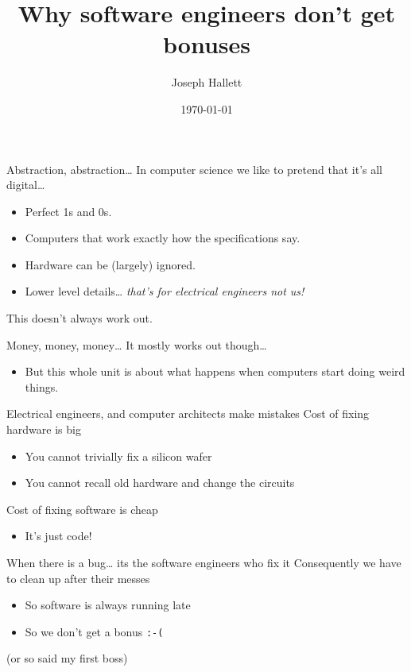 \documentclass[9pt,aspectratio=169]{beamer}
\author{Joseph Hallett}
\date{\today}
\title{Why software engineers don't get bonuses}
\begin{document}
\maketitle

\begin{frame}[label={sec:org03989aa}]{Abstraction, abstraction\ldots{}}
In computer science we like to pretend that it's all digital\ldots{}
\begin{itemize}
\item Perfect 1s and 0s.
\item Computers that work exactly how the specifications say.
\item Hardware can be (largely) ignored.
\item Lower level details\ldots{} \emph{that's for electrical engineers not us!}
\end{itemize}

\begin{block}{This doesn't always work out.}
\end{block}
\end{frame}

\begin{frame}[label={sec:orgb0a1e9e},fragile]{Money, money, money\ldots{}}
 It mostly works out though\ldots{}
\begin{itemize}
\item But this whole unit is about what happens when computers start doing weird things.
\end{itemize}

\begin{block}{Electrical engineers, and computer architects make mistakes}
Cost of fixing hardware is big
\begin{itemize}
\item You cannot trivially fix a silicon wafer
\item You cannot recall old hardware and change the circuits
\end{itemize}

Cost of fixing software is cheap
\begin{itemize}
\item It's just code!
\end{itemize}
\end{block}

\begin{block}{When there is a bug\ldots{} its the software engineers who fix it}
Consequently we have to clean up after their messes
\begin{itemize}
\item So software is always running late
\item So we don't get a bonus \texttt{:-(}

\vfill
\footnotesize
\end{itemize}
(or so said my first boss)
\end{block}
\end{frame}
\end{document}
